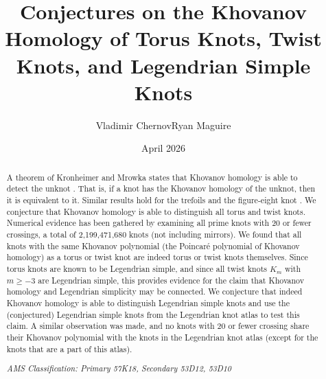 \documentclass{article}
\title{%
    Conjectures on the Khovanov Homology of Torus Knots, Twist Knots,
    and Legendrian Simple Knots%
}
\author{Vladimir Chernov\hspace{2em}Ryan Maguire}
\date{April 2026}
\theoremstyle{plain}
\begin{document}
    \maketitle
    \begin{abstract}
        \noindent
        A theorem of Kronheimer and Mrowka states that Khovanov homology is
        able to detect the unknot \cite{KronheimerMrowka2011KhovanovUnknot}.
        That is, if a knot has the Khovanov homology of the unknot, then it is
        equivalent to it. Similar results hold for the trefoils
        \cite{BaldwinSivekKhovanovTrefoils} and the figure-eight knot
        \cite{BaldwinDowlinKhovanovFigureEight}. We conjecture that Khovanov
        homology is able to distinguish all torus and twist knots.
        Numerical evidence has been gathered by examining all prime
        knots with 20 or fewer crossings, a total of 2,199,471,680 knots
        (not including mirrors). We found that all knots with the
        same Khovanov polynomial (the Poincar\'{e} polynomial of Khovanov
        homology) as a torus or twist knot are indeed torus or twist knots
        themselves. Since torus knots are known to be Legendrian
        simple, and since all twist knots $K_{m}$ with $m\geq{-3}$ are
        Legendrian simple, this provides evidence for the claim that
        Khovanov homology and Legendrian simplicity may be connected.
        We conjecture that indeed Khovanov homology is able to distinguish
        Legendrian simple knots and use the (conjectured) Legendrian simple
        knots from the Legendrian knot atlas \cite{LegendrianKnotAtlas} to
        test this claim.
        A similar observation was made, and no knots with 20 or fewer crossing
        share their Khovanov polynomial with the knots in the Legendrian
        knot atlas (except for the knots that are a part of this atlas).
        \par\hfill\par
        \textit{AMS Classification: Primary 57K18, Secondary 53D12, 53D10}
    \end{abstract}
\end{document}
